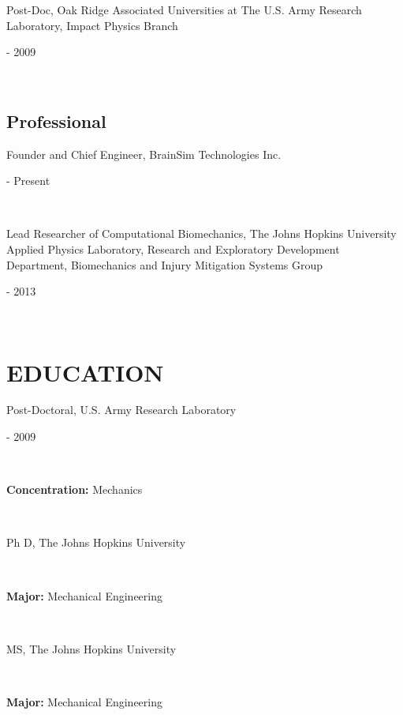 \documentclass[a4paper,10pt]{article}
\begin{document}
                \noindent \parbox[t]{0.8\linewidth}{\raggedright Post-Doc, Oak Ridge Associated Universities at The U.S. Army Research Laboratory, Impact Physics Branch} \hfill \parbox[t]{0.2\linewidth}{ - 2009} \\
                
    \subsection*{Professional}
    
                \noindent \parbox[t]{0.8\linewidth}{\raggedright Founder and Chief Engineer, BrainSim Technologies Inc.} \hfill \parbox[t]{0.2\linewidth}{ - Present} \\
                
                \noindent \parbox[t]{0.8\linewidth}{\raggedright Lead Researcher of Computational Biomechanics, The Johns Hopkins University Applied Physics Laboratory, Research and Exploratory Development Department, Biomechanics and Injury Mitigation Systems Group} \hfill \parbox[t]{0.2\linewidth}{ - 2013} \\
                

    \section*{EDUCATION}
    
            \noindent \parbox[t]{0.8\linewidth}{\raggedright Post-Doctoral, U.S. Army Research Laboratory} \hfill \parbox[t]{0.2\linewidth}{ - 2009} \\
            \noindent \parbox[t]{0.8\linewidth}{\raggedright \textbf{Concentration:} Mechanics} \\
            
            \noindent \parbox[t]{0.8\linewidth}{\raggedright Ph D, The Johns Hopkins University} \hfill \parbox[t]{0.2\linewidth}{} \\
            \noindent \parbox[t]{0.8\linewidth}{\raggedright \textbf{Major:} Mechanical Engineering} \\
            
            \noindent \parbox[t]{0.8\linewidth}{\raggedright MS, The Johns Hopkins University} \hfill \parbox[t]{0.2\linewidth}{} \\
            \noindent \parbox[t]{0.8\linewidth}{\raggedright \textbf{Major:} Mechanical Engineering} \\
            
\end{document}
